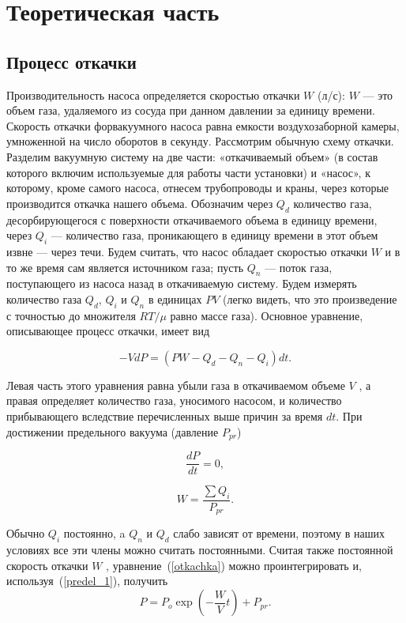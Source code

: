 \documentclass[a4paper,12pt]{article} %
\begin{document}
\section{Теоретическая часть}
\subsection{Процесс откачки}
	Производительность насоса определяется скоростью откачки $W$ (л/с): $W$ — это объем газа, удаляемого из сосуда при данном давлении за единицу времени. Скорость откачки форвакуумного насоса равна емкости воздухозаборной камеры, умноженной на число оборотов в секунду.
Рассмотрим обычную схему откачки. Разделим вакуумную систему на две части: «откачиваемый объем» (в состав которого включим используемые для работы части установки) и «насос», к которому, кроме самого насоса, отнесем трубопроводы и краны, через которые
производится откачка нашего объема. Обозначим через $Q_d$ количество газа, десорбирующегося с поверхности откачиваемого объема в единицу времени, через $Q_i$ — количество газа, проникающего в единицу времени в этот объем извне — через течи. Будем считать, что насос обладает скоростью откачки $W$ и в то же время сам является источником газа; пусть $Q_n$ — поток газа, поступающего из насоса назад в откачиваемую систему. Будем измерять количество газа $Q_d$, $Q_i$ и $Q_n$ в единицах $PV$ (легко видеть, что это произведение с точностью до множителя $RT/ \mu$ равно массе газа). Основное уравнение, описывающее процесс откачки, имеет вид

\begin{equation}
\label{otkachka}
	-VdP=(PW-Q_d-Q_n-Q_i)dt.
\end{equation}

Левая часть этого уравнения равна убыли газа в откачиваемом объеме $V$ , а правая определяет количество газа, уносимого насосом, и количество прибывающего вследствие перечисленных выше причин
за время $dt$. При достижении предельного вакуума (давление $P_{pr}$)

\begin{equation}
\label{predel_1}
	\frac{dP}{dt}=0,
\end{equation}

\begin{equation}
\label{predel_2}
	W=\frac{\sum Q_i}{P_{pr}}.
\end{equation}

Обычно $Q_i$ постоянно, a $Q_n$ и $Q_d$ слабо зависят от времени, поэтому в наших условиях все эти члены можно считать постоянными. Считая также постоянной скорость откачки $W$ , уравнение~(\ref{otkachka}) можно проинтегрировать и, используя~(\ref{predel_1}), получить
\begin{equation}
\label{davlenie}
	P = P_o \exp{(-\frac{W}{V} t)} + P_{pr}.
\end{equation}
\end{document}

